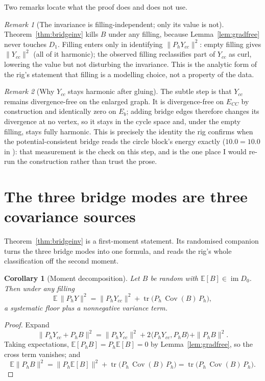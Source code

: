 \documentclass[11pt,a4paper]{article}
\newtheorem{corollary}{Corollary}
\theoremstyle{definition}
\theoremstyle{remark}
\newtheorem{remark}{Remark}
\newcommand{\im}{\operatorname{im}}
\newcommand{\Cov}{\operatorname{Cov}}
\newcommand{\tr}{\operatorname{tr}}
\newcommand{\Ph}{P_h}
\begin{document}
Two remarks locate what the proof does and does not use.

\begin{remark}[The invariance is filling-independent; only its value is not]\label{rem:fillingindep}
Theorem~\ref{thm:bridgeinv} kills $B$ under any filling, because Lemma~\ref{lem:gradfree} never touches $D_1$. Filling enters only in identifying $\|\Ph Y_{cc}\|^2$: empty filling gives $\|Y_{cc}\|^2$ (all of it harmonic); the observed filling reclassifies part of $Y_{cc}$ as curl, lowering the value but not disturbing the invariance. This is the analytic form of the rig's statement that filling is a modelling choice, not a property of the data.
\end{remark}

\begin{remark}[Why $Y_{cc}$ stays harmonic after gluing]\label{rem:yccglue}
The subtle step is that $Y_{cc}$ remains divergence-free on the enlarged graph. It is divergence-free on $E_{CC}$ by construction and identically zero on $E_b$; adding bridge edges therefore changes its divergence at no vertex, so it stays in the cycle space and, under the empty filling, stays fully harmonic. This is precisely the identity the rig confirms when the potential-consistent bridge reads the circle block's energy exactly ($10.0=10.0$ in \cite[\S3.2]{bradsher2026}): that measurement is the check on this step, and is the one place I would re-run the construction rather than trust the prose.
\end{remark}

\section{The three bridge modes are three covariance sources}\label{sec:modes}

Theorem~\ref{thm:bridgeinv} is a first-moment statement. Its randomised companion turns the three bridge modes into one formula, and reads the rig's whole classification off the second moment.

\begin{corollary}[Moment decomposition]\label{cor:moments}
Let $B$ be random with $\mathbb{E}[B]\in\im D_0$. Then under any filling
\[
\mathbb{E}\,\|\Ph Y\|^2
=
\|\Ph Y_{cc}\|^2
+
\tr\!\bigl(\Ph\,\Cov(B)\,\Ph\bigr),
\]
a systematic floor plus a nonnegative variance term.
\end{corollary}
\begin{proof}
Expand
\[
\|\Ph Y_{cc}+\Ph B\|^2
=
\|\Ph Y_{cc}\|^2
+2\langle\Ph Y_{cc},\Ph B\rangle
+\|\Ph B\|^2.
\]
Taking expectations, $\mathbb{E}[\Ph B]=\Ph\mathbb{E}[B]=0$ by Lemma~\ref{lem:gradfree}, so the cross term vanishes; and
\[
\mathbb{E}\|\Ph B\|^2
=
\|\Ph\mathbb{E}[B]\|^2
+
\tr\!\bigl(\Ph\,\Cov(B)\,\Ph\bigr)
=
\tr\!\bigl(\Ph\,\Cov(B)\,\Ph\bigr).
\]
\end{proof}
\end{document}
